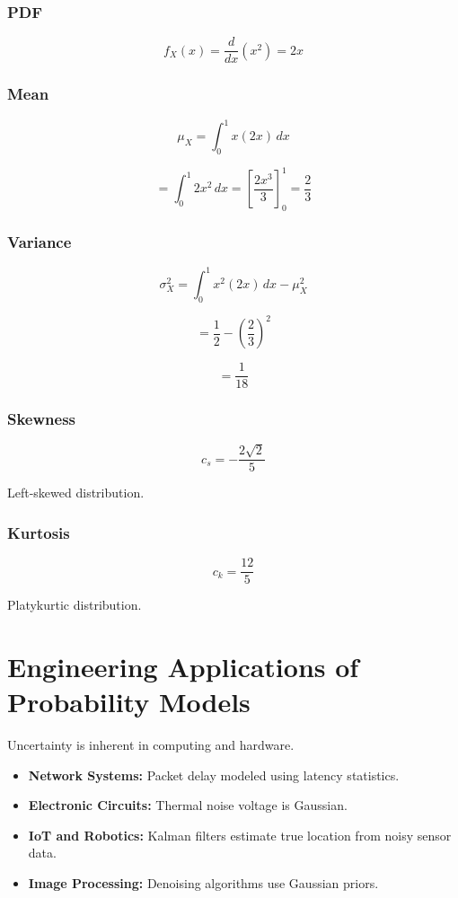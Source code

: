 \documentclass[12pt]{article}
\begin{document}
\subsubsection{PDF}

\[
f_X(x)=\frac{d}{dx}(x^2)=2x
\]

\subsubsection{Mean}

\[
\mu_X=\int_{0}^{1}x(2x)\,dx
\]

\[
=\int_{0}^{1}2x^2\,dx
=\left[\frac{2x^3}{3}\right]_0^1
=\frac{2}{3}
\]

\subsubsection{Variance}

\[
\sigma_X^2=\int_{0}^{1}x^2(2x)\,dx-\mu_X^2
\]

\[
=\frac{1}{2}-\left(\frac{2}{3}\right)^2
\]

\[
=\frac{1}{18}
\]

\subsubsection{Skewness}

\[
c_s=-\frac{2\sqrt{2}}{5}
\]

Left-skewed distribution.

\subsubsection{Kurtosis}

\[
c_k=\frac{12}{5}
\]

Platykurtic distribution.

\section{Engineering Applications of Probability Models}

Uncertainty is inherent in computing and hardware.

\begin{itemize}
    \item \textbf{Network Systems:} Packet delay modeled using latency statistics.
    \item \textbf{Electronic Circuits:} Thermal noise voltage is Gaussian.
    \item \textbf{IoT and Robotics:} Kalman filters estimate true location from noisy sensor data.
    \item \textbf{Image Processing:} Denoising algorithms use Gaussian priors.
\end{itemize}

\end{document}
